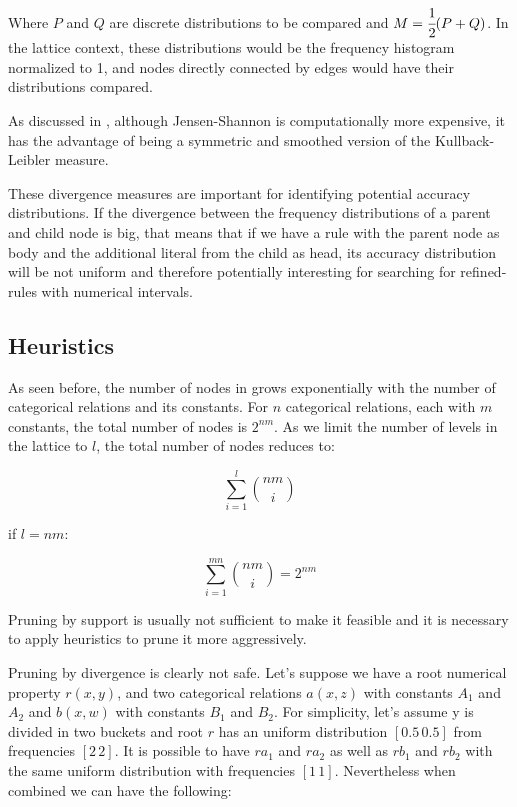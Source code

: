 Where $P$ and $Q$ are discrete distributions to be compared and $M=\cfrac{1}{2}(P+Q)$. In the lattice context, these
distributions would be the frequency histogram normalized to 1, and nodes directly connected by edges would have their
distributions compared.

As discussed in \cite{17795}, although Jensen-Shannon is computationally more expensive, it has the advantage of being a
symmetric and smoothed version of the Kullback-Leibler measure.

These divergence measures are important for identifying potential accuracy distributions. If the divergence between the
frequency distributions of a parent and child node is big, that means that if we have a rule with the parent node as
body and the additional literal from the child as head, its accuracy distribution will be not uniform and therefore
potentially interesting for searching for refined-rules with numerical intervals.


\subsection{Heuristics}

As seen before, the number of nodes in \graphname grows exponentially with the number of categorical relations
and its constants. For $n$ categorical relations, each with $m$ constants, the total number of nodes is $2^{nm}$. As we
limit the number of levels in the lattice to $l$, the total number of nodes reduces to:

\begin{center}
  \begin{equation}
    \sum_{i=1}^{l}\binom{nm}{i}
  \end{equation}
\end{center}

if $l=nm$:

\begin{center}
  \begin{equation}
    \sum_{i=1}^{mn}\binom{nm}{i} = 2^{nm}
  \end{equation}
\end{center}


Pruning by support is usually not sufficient to make it feasible and it is necessary to apply
heuristics to prune it more aggressively.


Pruning by divergence is clearly not safe. Let's suppose we have a root numerical property $r(x,y)$, and two categorical
relations $a(x,z)$ with constants $A_1$ and $A_2$ and $b(x,w)$ with constants $B_1$ and $B_2$. For simplicity, let's
assume y is divided in two buckets and root $r$ has an uniform distribution $[0.5 \, 0.5]$ from frequencies $[2 \, 2]$.
It is possible to have $r a_1$ and $r a_2$ as well as $r b_1$ and $r b_2$ with the same uniform distribution with
frequencies $[1 \, 1]$. Nevertheless when combined we can have the following:


